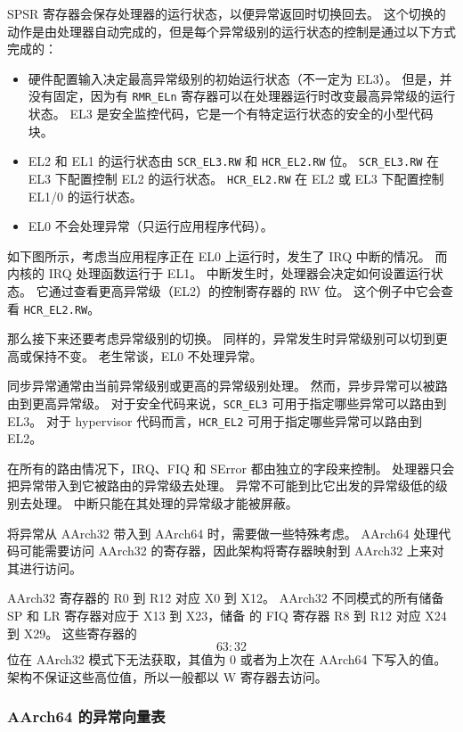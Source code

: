 SPSR 寄存器会保存处理器的运行状态，以便异常返回时切换回去。
这个切换的动作是由处理器自动完成的，但是每个异常级别的运行状态的控制是通过以下方式完成的：

\begin{itemize}
  \item 硬件配置输入决定最高异常级别的初始运行状态（不一定为 EL3）。
    但是，并没有固定，因为有 \lstinline!RMR_ELn! 寄存器可以在处理器运行时改变最高异常级的运行状态。
    EL3 是安全监控代码，它是一个有特定运行状态的安全的小型代码块。
  \item EL2 和 EL1 的运行状态由 \lstinline!SCR_EL3.RW! 和 \lstinline!HCR_EL2.RW! 位。
    \lstinline!SCR_EL3.RW! 在 EL3 下配置控制 EL2 的运行状态。
    \lstinline!HCR_EL2.RW! 在 EL2 或 EL3 下配置控制 EL1/0 的运行状态。
  \item EL0 不会处理异常（只运行应用程序代码）。
\end{itemize}

如下图所示，考虑当应用程序正在 EL0 上运行时，发生了 IRQ 中断的情况。
而内核的 IRQ 处理函数运行于 EL1。
中断发生时，处理器会决定如何设置运行状态。
它通过查看更高异常级（EL2）的控制寄存器的 RW 位。
这个例子中它会查看 \lstinline!HCR_EL2.RW!。


那么接下来还要考虑异常级别的切换。
同样的，异常发生时异常级别可以切到更高或保持不变。
老生常谈，EL0 不处理异常。

同步异常通常由当前异常级别或更高的异常级别处理。
然而，异步异常可以被路由到更高异常级。
对于安全代码来说，\lstinline!SCR_EL3! 可用于指定哪些异常可以路由到 EL3。
对于 hypervisor 代码而言，\lstinline!HCR_EL2! 可用于指定哪些异常可以路由到 EL2。

在所有的路由情况下，IRQ、FIQ 和 SError 都由独立的字段来控制。
处理器只会把异常带入到它被路由的异常级去处理。
异常不可能到比它出发的异常级低的级别去处理。
中断只能在其处理的异常级才能被屏蔽。

将异常从 AArch32 带入到 AArch64 时，需要做一些特殊考虑。
AArch64 处理代码可能需要访问 AArch32 的寄存器，因此架构将寄存器映射到 AArch32 上来对其进行访问。

AArch32 寄存器的 R0 到 R12 对应 X0 到 X12。
AArch32 不同模式的所有储备 SP 和 LR 寄存器对应于 X13 到 X23，储备 的 FIQ 寄存器 R8 到 R12 对应 X24 到 X29。
这些寄存器的 \[63:32\] 位在 AArch32 模式下无法获取，其值为 0 或者为上次在 AArch64 下写入的值。
架构不保证这些高位值，所以一般都以 W 寄存器去访问。

\subsubsection{AArch64 的异常向量表}


